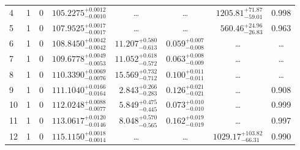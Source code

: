 \begin{table*}[!]
\begin{tabular}{llcrrlrc}
4 & 1 & 0 & $    105.2275_{-      0.0010}^{+      0.0012}$ & \multicolumn{1}{c}{\dots} & \multicolumn{1}{c}{\dots} & $     1205.81_{-       59.01}^{+       71.87}$ & 0.998\\[1pt]
5 & 1 & 0 & $    107.9525_{-      0.0017}^{+      0.0017}$ & \multicolumn{1}{c}{\dots} & \multicolumn{1}{c}{\dots} & $      560.46_{-       26.83}^{+       24.96}$ & 0.963\\[1pt]
6 & 1 & 0 & $    108.8450_{-      0.0042}^{+      0.0042}$ & $      11.207_{-       0.613}^{+       0.580}$ & $       0.059_{-       0.008}^{+       0.007}$ & \multicolumn{1}{c}{\dots} & \dots \\[1pt]
7 & 1 & 0 & $    109.6778_{-      0.0053}^{+      0.0049}$ & $      11.052_{-       0.572}^{+       0.618}$ & $       0.063_{-       0.009}^{+       0.008}$ & \multicolumn{1}{c}{\dots} & \dots \\[1pt]
8 & 1 & 0 & $    110.3390_{-      0.0076}^{+      0.0069}$ & $      15.569_{-       0.712}^{+       0.732}$ & $       0.100_{-       0.011}^{+       0.011}$ & \multicolumn{1}{c}{\dots} & \dots \\[1pt]
9 & 1 & 0 & $    111.1040_{-      0.0164}^{+      0.0166}$ & $       2.843_{-       0.283}^{+       0.266}$ & $       0.126_{-       0.021}^{+       0.021}$ & \multicolumn{1}{c}{\dots} & 0.908\\[1pt]
10 & 1 & 0 & $    112.0248_{-      0.0077}^{+      0.0088}$ & $       5.849_{-       0.445}^{+       0.475}$ & $       0.073_{-       0.010}^{+       0.010}$ & \multicolumn{1}{c}{\dots} & 0.999\\[1pt]
11 & 1 & 0 & $    113.0617_{-      0.0146}^{+      0.0120}$ & $       8.048_{-       0.565}^{+       0.570}$ & $       0.162_{-       0.019}^{+       0.019}$ & \multicolumn{1}{c}{\dots} & 0.997\\[1pt]
12 & 1 & 0 & $    115.1150_{-      0.0014}^{+      0.0018}$ & \multicolumn{1}{c}{\dots} & \multicolumn{1}{c}{\dots} & $     1029.17_{-       66.31}^{+      103.82}$ & 0.990\\[1pt]


\end{tabular}
\end{table*}
